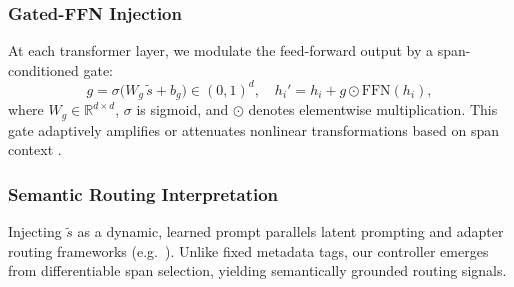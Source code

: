 \subsubsection{Gated-FFN Injection}
At each transformer layer, we modulate the feed-forward output by a span-conditioned gate:
\[
g = \sigma\bigl(W_g\,\tilde{s} + b_g\bigr)\in(0,1)^d,
\quad
h_i' = h_i + g \odot \mathrm{FFN}(h_i),
\]
where \(W_g\in\mathbb{R}^{d\times d}\), \(\sigma\) is sigmoid, and \(\odot\) denotes elementwise multiplication.  This gate adaptively amplifies or attenuates nonlinear transformations based on span context \cite{shazeer2017outrageously}.

\subsubsection{Semantic Routing Interpretation}
Injecting \(\tilde{s}\) as a dynamic, learned prompt parallels latent prompting and adapter routing frameworks (e.g.\ \cite{raffel2020exploring,liu2022pada,gupta2022molt}).  Unlike fixed metadata tags, our controller emerges from differentiable span selection, yielding semantically grounded routing signals.

